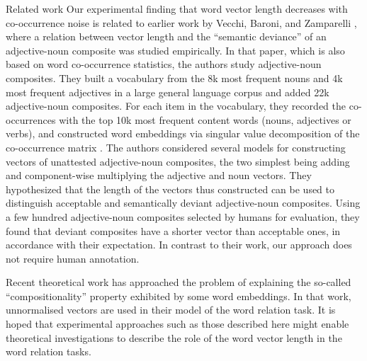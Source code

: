 \documentclass{article} %
\begin{document}
\begin{section}{Related work}
Our experimental finding that word vector length decreases with
co-occurrence noise is related to earlier work by Vecchi, Baroni, and
Zamparelli \cite{vecchi-baroni-zamparelli2011}, where a relation between
vector length and the ``semantic deviance'' of an adjective-noun
composite was studied empirically.  In that paper, which is also based
on word co-occurrence statistics, the authors study adjective-noun
composites.  They built a vocabulary from the 8k most frequent nouns and
4k most frequent adjectives in a large general language corpus and added
22k adjective-noun composites.  For each item in the vocabulary, they
recorded the co-occurrences with the top 10k most frequent content words
(nouns, adjectives or verbs), and constructed word embeddings via
singular value decomposition of the co-occurrence matrix
\cite{landauer-dumais1997}.  The authors considered several models for
constructing vectors of unattested adjective-noun composites, the two
simplest being adding and component-wise multiplying the adjective and
noun vectors.  They hypothesized that the length of the vectors thus
constructed can be used to distinguish acceptable and semantically
deviant adjective-noun composites.  Using a few hundred adjective-noun
composites selected by humans for evaluation, they found that deviant
composites have a shorter vector than acceptable ones, in accordance
with their expectation.  In contrast to their work, our approach does
not require human annotation.

Recent theoretical work \cite{Arora2015} has approached the problem of
explaining the so-called ``compositionality'' property exhibited by some
word embeddings.  In that work, unnormalised vectors are used in their
model of the word relation task.  It is hoped that experimental
approaches such as those described here might enable theoretical
investigations to describe the role of the word vector length in the
word relation tasks.
\end{section}
\end{document}
